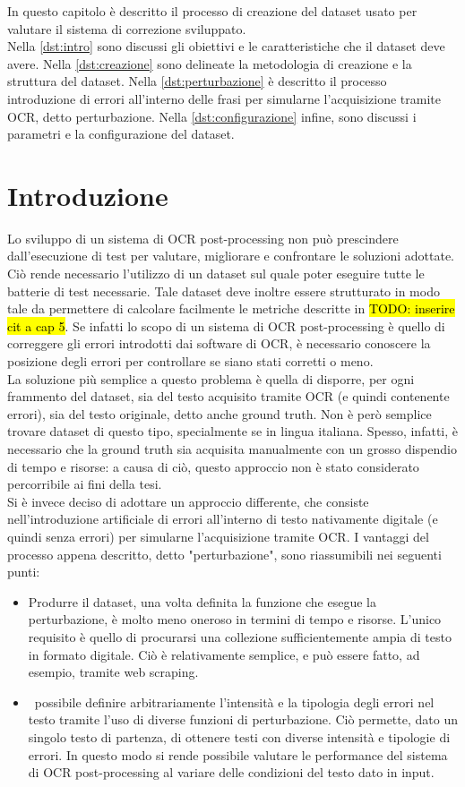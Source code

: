 In questo capitolo è descritto il processo di creazione del dataset usato per valutare il sistema di correzione sviluppato.\\
Nella \autoref{dst:intro} sono discussi gli obiettivi e le caratteristiche che il dataset deve avere. Nella \autoref{dst:creazione} sono delineate la metodologia di creazione e la struttura del dataset. Nella \autoref{dst:perturbazione} è descritto il processo introduzione di errori all'interno delle frasi per simularne l'acquisizione tramite OCR, detto perturbazione. Nella \autoref{dst:configurazione} infine, sono discussi i parametri e la configurazione del dataset.
\section{Introduzione}
\label{dst:intro}
Lo sviluppo di un sistema di OCR post-processing non può prescindere dall'esecuzione di test per valutare, migliorare e confrontare le soluzioni adottate. Ciò rende necessario l'utilizzo di un dataset sul quale poter eseguire tutte le batterie di test necessarie. Tale dataset deve inoltre essere strutturato in modo tale da permettere di calcolare facilmente le metriche descritte in \hl{TODO: inserire cit a cap 5}. Se infatti lo scopo di un sistema di OCR post-processing è quello di correggere gli errori introdotti dai software di OCR, è necessario conoscere la posizione degli errori per controllare se siano stati corretti o meno.\\
La soluzione più semplice a questo problema è quella di disporre, per ogni frammento del dataset, sia del testo acquisito tramite OCR (e quindi contenente errori), sia del testo originale, detto anche ground truth. Non è però semplice trovare dataset di questo tipo, specialmente se in lingua italiana. Spesso, infatti, è necessario che la ground truth sia acquisita manualmente con un grosso dispendio di tempo e risorse: a causa di ciò, questo approccio non è stato considerato percorribile ai fini della tesi.\\
Si è invece deciso di adottare un approccio differente, che consiste nell'introduzione artificiale di errori all'interno di testo nativamente digitale (e quindi senza errori) per simularne l'acquisizione tramite OCR. I vantaggi del processo appena descritto, detto "perturbazione", sono riassumibili nei seguenti punti:
\begin{itemize}
 \item Produrre il dataset, una volta definita la funzione che esegue la perturbazione, è molto meno oneroso in termini di tempo e risorse. L'unico requisito è quello di procurarsi una collezione sufficientemente ampia di testo in formato digitale. Ciò è relativamente semplice, e può essere fatto, ad esempio, tramite web scraping. 
 \item \E\ possibile definire arbitrariamente l'intensità e la tipologia degli errori nel testo tramite l'uso di diverse funzioni di perturbazione. Ciò permette, dato un singolo testo di partenza, di ottenere testi con diverse intensità e tipologie di errori. In questo modo si rende possibile valutare le performance del sistema di OCR post-processing al variare delle condizioni del testo dato in input.
\end{itemize}
